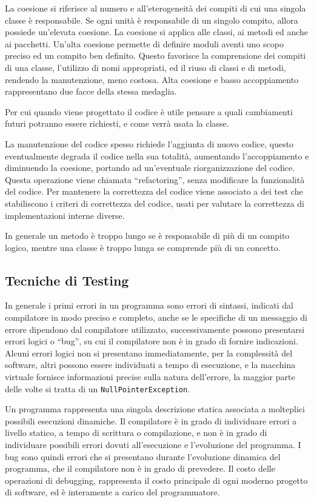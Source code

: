 \documentclass{article}
\numberwithin{equation}{subsection}
\begin{document}
La coesione si riferisce al numero e all'eterogeneità dei compiti di cui una singola classe è responsabile. Se ogni unità è responsabile di un singolo compito, allora possiede 
un'elevata coesione. La coesione si applica alle classi, ai metodi ed anche ai pacchetti. Un'alta coesione permette di definire moduli aventi uno scopo preciso ed un compito ben 
definito. Questo favorisce la comprensione dei compiti di una classe, l'utilizzo di nomi appropriati, ed il riuso di classi e di metodi, rendendo la manutenzione, meno costosa. 
Alta coesione e basso accoppiamento rappresentano due facce della stessa medaglia. %


Per cui quando viene progettato il codice è utile pensare a quali cambiamenti futuri potranno essere richiesti, e come verrà usata la classe. 


La manutenzione del codice spesso richiede l'aggiunta di nuovo codice, questo eventualmente degrada il codice nella sua totalità, aumentando l'accoppiamento e diminuendo la 
coesione, portando ad un'eventuale riorganizzazione del codice. Questa operazione viene chiamata ``refactoring'', senza modificare la funzionalità del codice. Per mantenere 
la correttezza del codice viene associato a dei test che stabiliscono i criteri di correttezza del codice, usati per valutare la correttezza di implementazioni interne diverse. 


In generale un metodo è troppo lungo se è responsabile di più di un compito logico, mentre una classe è troppo lunga se comprende più di un concetto. 


\subsection{Tecniche di Testing}

In generale i primi errori in un programma sono errori di sintassi, indicati dal compilatore in modo preciso e completo, anche se le specifiche di un messaggio di errore 
dipendono dal compilatore utilizzato, successivamente possono presentarsi errori logici o ``bug'', su cui il compilatore non è in grado di fornire indicazioni. 
Alcuni errori logici non si presentano immediatamente, per la complessità del software, altri possono essere individuati a tempo di esecuzione, e la macchina virtuale 
fornisce informazioni precise sulla natura dell'errore, la maggior parte delle volte si tratta di un \verb|NullPointerException|. 

Un programma rappresenta una singola descrizione statica associata a molteplici possibili esecuzioni dinamiche. Il compilatore è in grado di individuare errori a livello statico, 
a tempo di scrittura o compilazione, e non è in grado di individuare possibili errori dovuti all'esecuzione e l'evoluzione del programma. 
I bug sono quindi errori che si presentano durante l'evoluzione dinamica del programma, che il compilatore non è in grado di prevedere. Il costo delle operazioni di debugging, 
rappresenta il costo principale di ogni moderno progetto di software, ed è interamente a carico del programmatore. 
\end{document}
